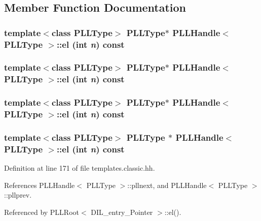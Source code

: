 \subsection{Member Function Documentation}
\subsubsection{\setlength{\rightskip}{0pt plus 5cm}template$<$class PLLType$>$ {\bf PLLType}$\ast$ PLLHandle$<$ {\bf PLLType} $>$::el (int {\em n}) const\hspace{0.3cm}{\tt  [inline]}}\label{classPLLHandle_a44}


\subsubsection{\setlength{\rightskip}{0pt plus 5cm}template$<$class PLLType$>$ {\bf PLLType}$\ast$ PLLHandle$<$ {\bf PLLType} $>$::el (int {\em n}) const\hspace{0.3cm}{\tt  [inline]}}\label{classPLLHandle_a31}


\subsubsection{\setlength{\rightskip}{0pt plus 5cm}template$<$class PLLType$>$ {\bf PLLType}$\ast$ PLLHandle$<$ {\bf PLLType} $>$::el (int {\em n}) const\hspace{0.3cm}{\tt  [inline]}}\label{classPLLHandle_a18}


\subsubsection{\setlength{\rightskip}{0pt plus 5cm}template$<$class PLLType$>$ {\bf PLLType} $\ast$ PLLHandle$<$ {\bf PLLType} $>$::el (int {\em n}) const\hspace{0.3cm}{\tt  [inline]}}\label{classPLLHandle_a5}




Definition at line 171 of file templates.classic.hh.

References PLLHandle$<$ PLLType $>$::pllnext, and PLLHandle$<$ PLLType $>$::pllprev.

Referenced by PLLRoot$<$ DIL\_\-entry\_\-Pointer $>$::el().



